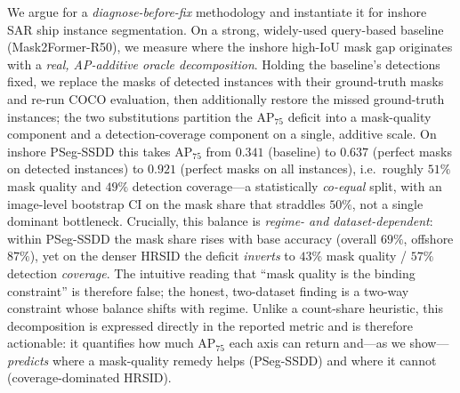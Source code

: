 \documentclass[journal]{IEEEtran}
\begin{document}
We argue for a \emph{diagnose-before-fix} methodology and instantiate it for inshore SAR ship instance segmentation. On a strong, widely-used query-based baseline (Mask2Former-R50), we measure where the inshore high-IoU mask gap originates with a \emph{real, AP-additive oracle decomposition}. Holding the baseline's detections fixed, we replace the masks of detected instances with their ground-truth masks and re-run COCO evaluation, then additionally restore the missed ground-truth instances; the two substitutions partition the AP$_{75}$ deficit into a mask-quality component and a detection-coverage component on a single, additive scale. On inshore PSeg-SSDD this takes AP$_{75}$ from $0.341$ (baseline) to $0.637$ (perfect masks on detected instances) to $0.921$ (perfect masks on all instances), i.e.\ roughly $51\%$ mask quality and $49\%$ detection coverage---a statistically \emph{co-equal} split, with an image-level bootstrap CI on the mask share that straddles $50\%$, not a single dominant bottleneck. Crucially, this balance is \emph{regime- and dataset-dependent}: within PSeg-SSDD the mask share rises with base accuracy (overall $69\%$, offshore $87\%$), yet on the denser HRSID the deficit \emph{inverts} to $43\%$ mask quality / $57\%$ detection \emph{coverage}. The intuitive reading that ``mask quality is the binding constraint'' is therefore false; the honest, two-dataset finding is a two-way constraint whose balance shifts with regime. Unlike a count-share heuristic, this decomposition is expressed directly in the reported metric and is therefore actionable: it quantifies how much AP$_{75}$ each axis can return and---as we show---\emph{predicts} where a mask-quality remedy helps (PSeg-SSDD) and where it cannot (coverage-dominated HRSID).
\end{document}
